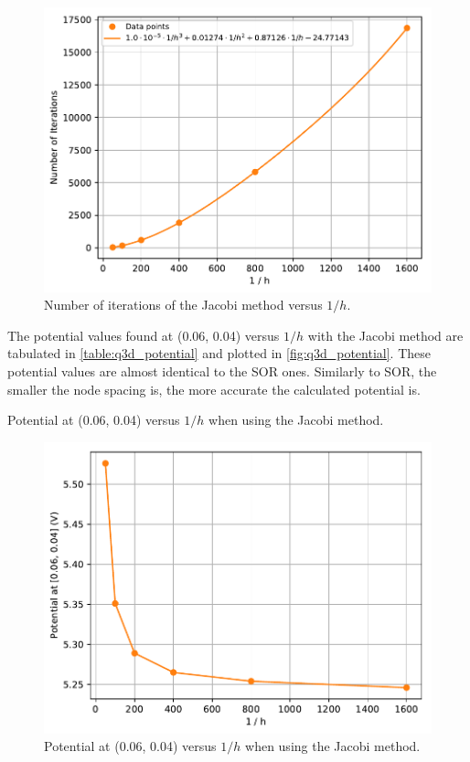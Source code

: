 \documentclass[a4paper,titlepage]{article}
\begin{document}
	\begin{figure}[!htb]
		\centering
		\includegraphics[width=\columnwidth]{plots/q3d_iterations.pdf}
		\caption
		{Number of iterations of the Jacobi method versus $1/h$.}
		\label{fig:q3d_iterations}
	\end{figure}

	The potential values found at (0.06, 0.04) versus $1/h$ with the Jacobi method are tabulated in \autoref{table:q3d_potential} and plotted in \autoref{fig:q3d_potential}. These potential values are almost identical to the SOR ones. Similarly to SOR, the smaller the node spacing is, the more accurate the calculated potential is.

	\begin{table}[!htb]
		\centering
		\caption{Potential at (0.06, 0.04) versus $1/h$ when using the Jacobi method.}
		\label{table:q3d_potential}
	\end{table}

	\begin{figure}[!htb]
		\centering
		\includegraphics[width=\columnwidth]{plots/q3d_potential.pdf}
		\caption
		{Potential at (0.06, 0.04) versus $1/h$ when using the Jacobi method.}
		\label{fig:q3d_potential}
	\end{figure}
\end{document}

